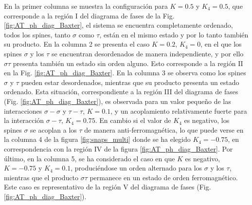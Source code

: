 En la primer columna se muestra la configuración para $K=0.5$ y $K_{4}=0.5$, que corresponde a la región I del diagrama de fases de
 la Fig. \ref{fig:AT_ph_diag_Baxter}, el sistema se encuentra completamente ordenado, todos los spines, tanto $\sigma$ como $\tau$, están en el mismo estado y
 por lo tanto también su producto.
En la columna 2 se presenta el caso $K=0.2$, $K_{4}=0$, en el que los spines $\sigma$ y los $\tau$ se encuentran desordenados de manera independiente,
 y por ello $\sigma\tau$ presenta también un estado sin orden alguno. Esto corresponde a la región II en la Fig. \ref{fig:AT_ph_diag_Baxter}.
En la columna 3 se observa como los spines $\sigma$ y $\tau$ pueden estar desordenados, mientras que su producto presenta un estado ordenado. Esta
 situación, correspondiente a la región III del diagrama de fases (Fig. \ref{fig:AT_ph_diag_Baxter}), es observada para un valor pequeño de las
 interacciones $\sigma-\sigma$ y $\tau-\tau$, $K=0.1$, y un acoplamiento relativamente fuerte para la interacción $\sigma-\tau$, $K_{4}=0.75$.
En cambio si el valor de $K_{4}$ es negativo, los spines $\sigma$ se acoplan a los $\tau$ de manera anti-ferromagnética, lo que puede verse en
 la columna 4 de la figura \ref{fig:snaps_multi} donde se ha elegido $K_{4}=-0.75$, en correspondencia con la región IV de la figura \ref{fig:AT_ph_diag_Baxter}.
Por último, en la columna 5, se ha considerado el caso en que $K$ es negativo, $K=-0.75$ y $K_{4}=0.1$, produciéndose un orden alternado para los $\sigma$ y los $\tau$,
 mientras que el producto $\sigma\tau$ permanece en un estado de orden ferromagnético. Este caso es representativo de la región V del diagrama de fases (Fig. \ref{fig:AT_ph_diag_Baxter}).\\

